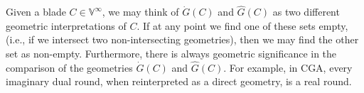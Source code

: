 \documentclass{birkjour}
\theoremstyle{definition}
\theoremstyle{remark}
\numberwithin{equation}{section}
\newcommand{\V}{\mathbb{V}}
\newcommand{\Gi}{\dot{G}}
\newcommand{\Go}{\hat{G}}
\begin{document}
Given a blade $C\in\V^\infty$, we may think of $\Gi(C)$ and
$\Go(C)$ as two different geometric interpretations of $C$.
If at any point we find one of these sets empty, (i.e., if we
intersect two non-intersecting geometries), then we may find
the other set as non-empty.  Furthermore, there is always
geometric significance in the comparison of the geometries
$\Gi(C)$ and $\Go(C)$.  For example, in CGA,
every imaginary dual round, when reinterpreted as a direct geometry,
is a real round.




\end{document}
